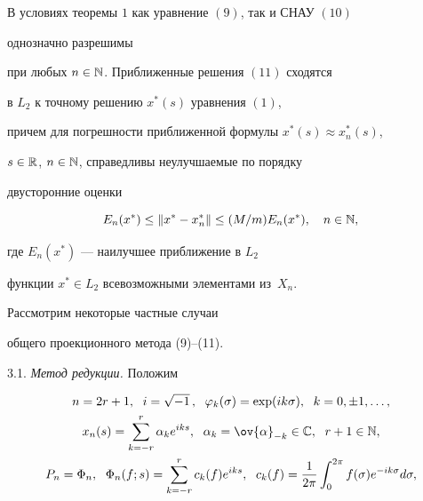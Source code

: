 \begin{thm}


В условиях теоремы $1$ как уравнение $(9)$, так и СНАУ $(10)$


однозначно разрешимы


при любых $n\in \Bbb N$. Приближенные решения $(11)$ сходятся


в $L_2$ к точному решению $x^\ast (s)$ уравнения $(1)$,


причем для погрешности приближенной формулы $x^*(s)\approx x_n^*(s)$,


$s\in \Bbb R$, $n\in \Bbb N$, справедливы неулучшаемые по порядку


двусторонние оценки


\begin{equation}


E_n(x^\ast)\leq \|x^\ast -x_n^*\|\leq (M/m) E_n(x^\ast),


\quad n\in \Bbb N,


\end{equation}


где $E_n(x^\ast)$ --- наилучшее приближение в $L_2$


функции $x^\ast \in L_2$ всевозможными элементами из~$X_n$.


\end{thm}





Рассмотрим некоторые частные случаи


общего проекционного метода (9)--(11).


\medskip





3.1. {\it Метод редукции.} Положим


\begin{gather}


n=2r+1,\ \; i=\sqrt{-1}\,,\ \; \varphi_k(\sigma)=


\exp(ik\sigma),\ \; k=0,\pm 1,\dotsc, \notag\\


%


x_n(s)=\sum_{k=-r}^r\alpha_k e^{iks},\ \;


\alpha_k=\ov{\alpha }_{-k}\in \Bbb C,\ \;


r+1\in \Bbb N, \\


%


P_n=\Phi_n,\ \; \Phi_n(f;s)=\sum_{k=-r}^rc_k(f) e^{iks},\ \;


c_k(f)=\frac{1}{2\pi }\int_0^{2\pi }f(\sigma)


e^{-ik\sigma } d\sigma,


\end{gather}


